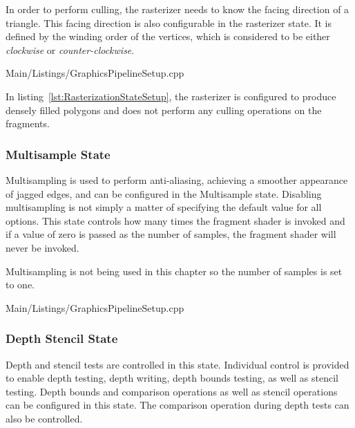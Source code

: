         In order to perform culling, the rasterizer needs to know the facing direction of a triangle.
        This facing direction is also configurable in the rasterizer state.
        It is defined by the winding order of the vertices, which is considered to be either \textit{clockwise} or \textit{counter-clockwise}.

        
        {Main/Listings/GraphicsPipelineSetup.cpp}


        In listing~\ref{lst:RasterizationStateSetup}, the rasterizer is configured to produce densely filled polygons and does not perform any culling operations on the fragments.

      \subsubsection{Multisample State}
        \label{sss:MultisampleState}
        Multisampling is used to perform anti-aliasing, achieving a smoother appearance of jagged edges, and can be configured in the Multisample state.
        Disabling multisampling is not simply a matter of specifying the default value for all options.
        This state controls how many times the fragment shader is invoked and if a value of zero is passed as the number of samples, the fragment shader will never be invoked.

        Multisampling is not being used in this chapter so the number of samples is set to one.

        
        {Main/Listings/GraphicsPipelineSetup.cpp}

      \subsubsection{Depth Stencil State}
        Depth and stencil tests are controlled in this state.
        Individual control is provided to enable depth testing, depth writing, depth bounds testing, as well as stencil testing.
        Depth bounds and comparison operations as well as stencil operations can be configured in this state.
        The comparison operation during depth tests can also be controlled.

